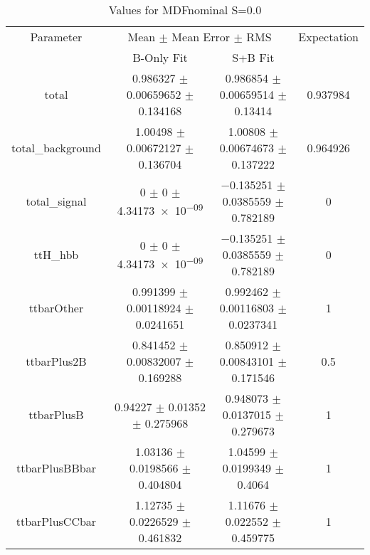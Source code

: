 \begin{table}
\centering
\caption{Values for MDFnominal S=0.0}
\begin{tabular}{cccc}
\toprule
Parameter & \multicolumn{2}{c}{Mean $\pm$ Mean Error $\pm$ RMS} & Expectation\\
 & B-Only Fit & S+B Fit & \\
\midrule
total & \num{0.986327} $\pm$ \num{0.00659652} $\pm$ \num{0.134168} & \num{0.986854} $\pm$ \num{0.00659514} $\pm$ \num{0.13414} & \num{0.937984}\\
total\_background & \num{1.00498} $\pm$ \num{0.00672127} $\pm$ \num{0.136704} & \num{1.00808} $\pm$ \num{0.00674673} $\pm$ \num{0.137222} & \num{0.964926}\\
total\_signal & \num{0} $\pm$ \num{0} $\pm$ \num{4.34173e-09} & \num{-0.135251} $\pm$ \num{0.0385559} $\pm$ \num{0.782189} & \num{0}\\
ttH\_hbb & \num{0} $\pm$ \num{0} $\pm$ \num{4.34173e-09} & \num{-0.135251} $\pm$ \num{0.0385559} $\pm$ \num{0.782189} & \num{0}\\
ttbarOther & \num{0.991399} $\pm$ \num{0.00118924} $\pm$ \num{0.0241651} & \num{0.992462} $\pm$ \num{0.00116803} $\pm$ \num{0.0237341} & \num{1}\\
ttbarPlus2B & \num{0.841452} $\pm$ \num{0.00832007} $\pm$ \num{0.169288} & \num{0.850912} $\pm$ \num{0.00843101} $\pm$ \num{0.171546} & \num{0.5}\\
ttbarPlusB & \num{0.94227} $\pm$ \num{0.01352} $\pm$ \num{0.275968} & \num{0.948073} $\pm$ \num{0.0137015} $\pm$ \num{0.279673} & \num{1}\\
ttbarPlusBBbar & \num{1.03136} $\pm$ \num{0.0198566} $\pm$ \num{0.404804} & \num{1.04599} $\pm$ \num{0.0199349} $\pm$ \num{0.4064} & \num{1}\\
ttbarPlusCCbar & \num{1.12735} $\pm$ \num{0.0226529} $\pm$ \num{0.461832} & \num{1.11676} $\pm$ \num{0.022552} $\pm$ \num{0.459775} & \num{1}\\
\bottomrule
\end{tabular}
\end{table}